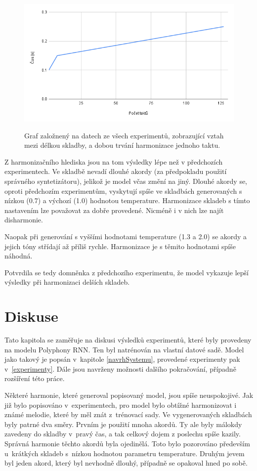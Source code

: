 \begin{figure}[h]\centering
    \centering
    \includegraphics[width=0.8\linewidth]{obrazky/chartCasHarmonizace.png}\\[1pt]  
    \caption{Graf založnený na datech ze všech experimentů,
     zobrazující vztah mezi délkou skladby, a dobou trvání harmonizace jednoho taktu.}    
    \label{obrazekCasHarmonizace}
\end{figure}

Z harmonizačního hlediska jsou na tom výsledky lépe než v předchozích experimentech.
Ve skladbě nevadí dlouhé akordy (za předpokladu použití správného syntetizátoru),
jelikož je model včas změní na jiný.
Dlouhé akordy se, oproti předchozím experimentům,
vyskytují spíše ve skladbách generovaných s nízkou (0.7) a výchozí (1.0) hodnotou temperature.
Harmonizace skladeb s tímto nastavením lze považovat za dobře provedené.
Nicméně i v nich lze najít disharmonie.
\par
Naopak při generování s vyššími hodnotami temperature (1.3 a 2.0) 
se akordy a jejich tóny střídají až příliš rychle.
Harmonizace je s těmito hodnotami spíše náhodná.
\par
Potvrdila se tedy domněnka z předchozího experimentu,
že model vykazuje lepší výsledky při harmonizaci
delších skladeb.


\chapter{Diskuse}
Tato kapitola se zaměřuje na diskusi výsledků experimentů,
které byly provedeny na modelu Polyphony RNN.
Ten byl natrénován na vlastní datové sadě.
Model jako takový je popsán v~kapitole \ref{navrhSystemu},
provedené experimenty pak v~\ref{experimenty}.
Dále jsou navrženy možnosti dalšího pokračování,
případně rozšíření této práce.
\par

Některé harmonie, které generoval popisovaný model,
jsou spíše neuspokojivé.
Jak již bylo popisováno v~experimentech, 
pro model bylo obtížné harmonizovat i známé melodie, 
které by měl znát z~trénovací sady. 
Ve vygenerovaných skladbách byly patrné dva směry.
Prvním je použití mnoha akordů.
Ty ale byly málokdy zavedeny do skladby v~pravý čas, 
a tak celkový dojem z poslechu spíše kazily.
Správná harmonie těchto akordů byla ojedinělá.
Toto bylo pozorováno především u~krátkých skladeb 
s~nízkou hodnotou parametru temperature.
Druhým jevem byl jeden akord, 
který byl nevhodně dlouhý,
případně se opakoval hned po sobě.
\par

